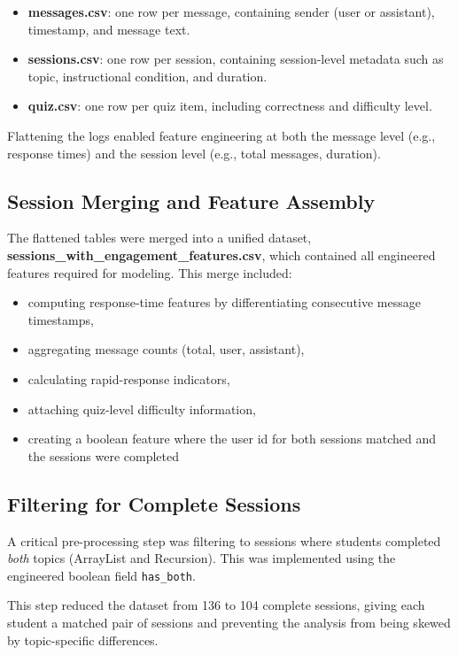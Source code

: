 \documentclass[conference]{IEEEtran}
\begin{document}
\begin{itemize}[noitemsep]
    \item \textbf{messages.csv}: one row per message, containing sender (user or assistant), timestamp, and message text.
    \item \textbf{sessions.csv}: one row per session, containing session-level metadata such as topic, instructional condition, and duration.
    \item \textbf{quiz.csv}: one row per quiz item, including correctness and difficulty level.
\end{itemize}

Flattening the logs enabled feature engineering at both the message level (e.g., response times) and the session level (e.g., total messages, duration).

\subsection{Session Merging and Feature Assembly}
The flattened tables were merged into a unified dataset, \textbf{sessions\_with\_engagement\_features.csv}, which contained all engineered features required for modeling. This merge included:

\begin{itemize}[noitemsep]
    \item computing response-time features by differentiating consecutive message timestamps,
    \item aggregating message counts (total, user, assistant),
    \item calculating rapid-response indicators,
    \item attaching quiz-level difficulty information,
    \item creating a boolean feature where the user id for both sessions matched and the sessions were completed
\end{itemize}



\subsection{Filtering for Complete Sessions}
A critical pre-processing step was filtering to sessions where students completed \emph{both} topics (ArrayList and Recursion). This was implemented using the engineered boolean field \texttt{has\_both}.

This step reduced the dataset from 136 to 104 complete sessions, giving each student a matched pair of sessions and preventing the analysis from being skewed by topic-specific differences.
\end{document}
